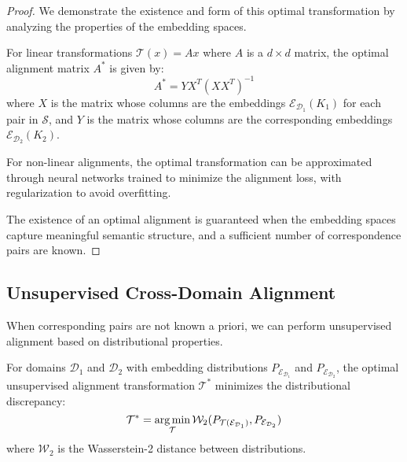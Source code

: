 \begin{proof}
We demonstrate the existence and form of this optimal transformation by analyzing the properties of the embedding spaces.

For linear transformations $\mathcal{T}(x) = Ax$ where $A$ is a $d \times d$ matrix, the optimal alignment matrix $A^*$ is given by:
\begin{equation}
A^* = YX^T(XX^T)^{-1}
\end{equation}
where $X$ is the matrix whose columns are the embeddings $\mathcal{E}_{\mathcal{D}_1}(K_1)$ for each pair in $\mathcal{S}$, and $Y$ is the matrix whose columns are the corresponding embeddings $\mathcal{E}_{\mathcal{D}_2}(K_2)$.

For non-linear alignments, the optimal transformation can be approximated through neural networks trained to minimize the alignment loss, with regularization to avoid overfitting.

The existence of an optimal alignment is guaranteed when the embedding spaces capture meaningful semantic structure, and a sufficient number of correspondence pairs are known.
\end{proof}

\subsection{Unsupervised Cross-Domain Alignment}

When corresponding pairs are not known a priori, we can perform unsupervised alignment based on distributional properties.

\begin{theorem}
For domains $\mathcal{D}_1$ and $\mathcal{D}_2$ with embedding distributions $P_{\mathcal{E}_{\mathcal{D}_1}}$ and $P_{\mathcal{E}_{\mathcal{D}_2}}$, the optimal unsupervised alignment transformation $\mathcal{T}^*$ minimizes the distributional discrepancy:
\begin{equation}
\mathcal{T}^* = \mathop{\mathrm{arg\,min}}_{\mathcal{T}} \mathcal{W}_2(P_{\mathcal{T}(\mathcal{E}_{\mathcal{D}_1})}, P_{\mathcal{E}_{\mathcal{D}_2}})
\end{equation}
where $\mathcal{W}_2$ is the Wasserstein-2 distance between distributions.
\end{theorem}

